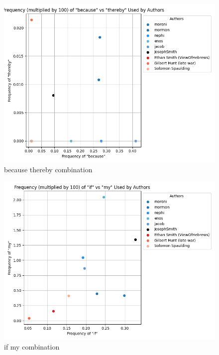 \documentclass[
  letterpaper,
  DIV=11,
  numbers=noendperiod]{scrartcl}
\begin{document}
\begin{figure}

{\centering \includegraphics{Graphs/Word Comparisons/because_thereby_output.png}

}

\caption{because thereby combination}

\end{figure}

\begin{figure}

{\centering \includegraphics{Graphs/Word Comparisons/if_my_output.png}

}

\caption{if my combination}

\end{figure}
\end{document}

